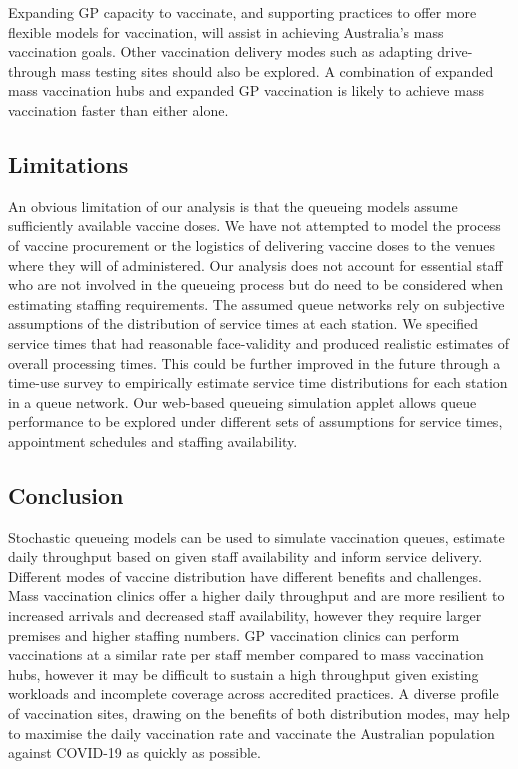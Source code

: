 \documentclass{article}
\begin{document}
Expanding GP capacity to vaccinate, and supporting practices to offer
more flexible models for vaccination, will assist in achieving
Australia's mass vaccination goals. Other vaccination delivery modes
such as adapting drive-through mass testing sites should also be
explored. A combination of expanded mass vaccination hubs and expanded
GP vaccination is likely to achieve mass vaccination faster than either
alone.

\hypertarget{limitations}{%
\subsection{Limitations}\label{limitations}}

An obvious limitation of our analysis is that the queueing models assume
sufficiently available vaccine doses. We have not attempted to model the
process of vaccine procurement or the logistics of delivering vaccine
doses to the venues where they will of administered. Our analysis does
not account for essential staff who are not involved in the queueing
process but do need to be considered when estimating staffing
requirements. The assumed queue networks rely on subjective assumptions
of the distribution of service times at each station. We specified
service times that had reasonable face-validity and produced realistic
estimates of overall processing times. This could be further improved in
the future through a time-use survey to empirically estimate service
time distributions for each station in a queue network. Our web-based
queueing simulation applet allows queue performance to be explored under
different sets of assumptions for service times, appointment schedules
and staffing availability.

\hypertarget{conclusion}{%
\subsection{Conclusion}\label{conclusion}}

Stochastic queueing models can be used to simulate vaccination queues,
estimate daily throughput based on given staff availability and inform
service delivery. Different modes of vaccine distribution have different
benefits and challenges. Mass vaccination clinics offer a higher daily
throughput and are more resilient to increased arrivals and decreased
staff availability, however they require larger premises and higher
staffing numbers. GP vaccination clinics can perform vaccinations at a
similar rate per staff member compared to mass vaccination hubs, however
it may be difficult to sustain a high throughput given existing
workloads and incomplete coverage across accredited practices. A diverse
profile of vaccination sites, drawing on the benefits of both
distribution modes, may help to maximise the daily vaccination rate and
vaccinate the Australian population against COVID-19 as quickly as
possible.
\end{document}
